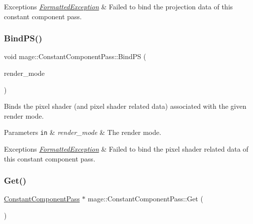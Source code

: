 \begin{DoxyExceptions}{Exceptions}
{\em \hyperlink{structmage_1_1_formatted_exception}{Formatted\+Exception}} & Failed to bind the projection data of this constant component pass. \\
\hline
\end{DoxyExceptions}
\hypertarget{classmage_1_1_constant_component_pass_a6027d0f628ffd03618aebacb35672c6e}{}\label{classmage_1_1_constant_component_pass_a6027d0f628ffd03618aebacb35672c6e} 
\subsubsection{\texorpdfstring{Bind\+P\+S()}{BindPS()}}
{\footnotesize\ttfamily void mage\+::\+Constant\+Component\+Pass\+::\+Bind\+PS (\begin{DoxyParamCaption}\item[{\hyperlink{namespacemage_a5e7e18b0154373ce8fc942fe3f6b27fd}{Render\+Mode}}]{render\+\_\+mode }\end{DoxyParamCaption})\hspace{0.3cm}{\ttfamily [private]}}

Binds the pixel shader (and pixel shader related data) associated with the given render mode.


\begin{DoxyParams}[1]{Parameters}
\mbox{\tt in}  & {\em render\+\_\+mode} & The render mode. \\
\hline
\end{DoxyParams}

\begin{DoxyExceptions}{Exceptions}
{\em \hyperlink{structmage_1_1_formatted_exception}{Formatted\+Exception}} & Failed to bind the pixel shader related data of this constant component pass. \\
\hline
\end{DoxyExceptions}
\hypertarget{classmage_1_1_constant_component_pass_ae8c8c69c9e69c4324e390833c2e3653b}{}\label{classmage_1_1_constant_component_pass_ae8c8c69c9e69c4324e390833c2e3653b} 
\subsubsection{\texorpdfstring{Get()}{Get()}}
{\footnotesize\ttfamily \hyperlink{classmage_1_1_constant_component_pass}{Constant\+Component\+Pass} $\ast$ mage\+::\+Constant\+Component\+Pass\+::\+Get (\begin{DoxyParamCaption}{ }\end{DoxyParamCaption})\hspace{0.3cm}{\ttfamily [static]}}

